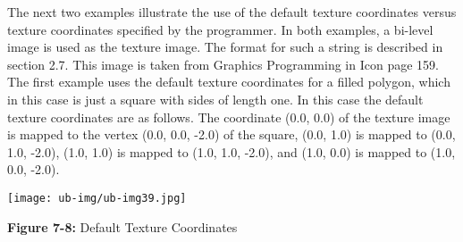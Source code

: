 
The next two examples illustrate the use of the default texture
coordinates versus texture coordinates specified by the programmer. In
both examples, a bi-level image is used as the texture image. The
format for such a string is described in section 2.7. This image is
taken from Graphics Programming in Icon page 159. The first example
uses the default texture coordinates for a filled polygon, which in
this case is just a square with sides of length one. In this case the
default texture coordinates are as follows. The coordinate (0.0, 0.0)
of the texture image is mapped to the vertex (0.0, 0.0, -2.0) of the
square, (0.0, 1.0) is mapped to (0.0, 1.0, -2.0), (1.0, 1.0) is mapped
to (1.0, 1.0, -2.0), and (1.0, 0.0) is mapped to (1.0, 0.0, -2.0).

\begin{center}
{\texttt{[image: ub-img/ub-img39.jpg]}}

{\sffamily\bfseries Figure 7-8:}
{\sffamily Default Texture Coordinates}
\end{center}

